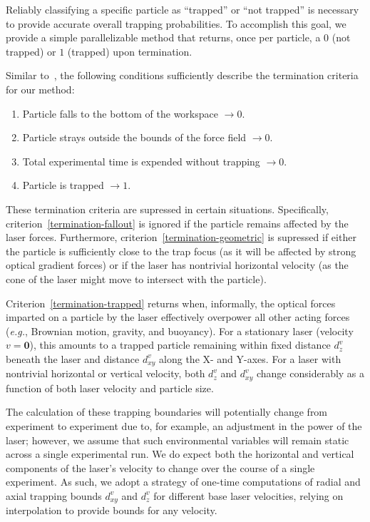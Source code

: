 %

Reliably classifying a specific particle as ``trapped'' or ``not trapped'' is
necessary to provide accurate overall trapping probabilities.  To accomplish
this goal, we provide a simple parallelizable method that returns, once per
particle, a $0$ (not trapped) or $1$ (trapped) upon termination.

Similar to~\cite{banerjee2009generating}, the following conditions sufficiently
describe the termination criteria for our method:
\begin{enumerate}
 \item \label{termination-fallout} Particle falls to the bottom of the
workspace $\rightarrow 0$.
 \item \label{termination-geometric} Particle strays outside the bounds
of the force field $\rightarrow 0$.
 \item \label{termination-timeout} Total experimental time is
expended without trapping $\rightarrow 0$.
 \item \label{termination-trapped} Particle is trapped $\rightarrow 1$.
\end{enumerate}

These termination criteria are supressed in certain
situations. Specifically, criterion~\ref{termination-fallout} is
ignored if the particle remains affected by the laser forces.
Furthermore, criterion~\ref{termination-geometric} is supressed if
either the particle is sufficiently close to the trap focus (as it
will be affected by strong optical gradient forces) or if the laser
has nontrivial horizontal velocity (as the cone of the laser might
move to intersect with the particle).

Criterion~\ref{termination-trapped} returns when, informally, the
optical forces imparted on a particle by the laser effectively
overpower all other acting forces (\emph{e.g.}, Brownian motion,
gravity, and buoyancy).  For a stationary laser (velocity $v =
\textbf{0}$), this amounts to a trapped particle remaining within
fixed distance $d^v_z$ beneath the laser and distance $d^v_{xy}$ along
the X- and Y-axes.  For a laser with nontrivial horizontal or vertical
velocity, both $d^v_z$ and $d^v_{xy}$ change considerably as a
function of both laser velocity and particle size.

The calculation of these trapping boundaries will potentially change
from experiment to experiment due to, for example, an adjustment in
the power of the laser; however, we assume that such environmental
variables will remain static across a single experimental run.  We do
expect both the horizontal and vertical components of the laser's
velocity to change over the course of a single experiment. As such, we
adopt a strategy of one-time computations of radial and axial trapping
bounds $d^v_{xy}$ and $d^v_{z}$ for different base laser velocities,
relying on interpolation to provide bounds for any velocity.

